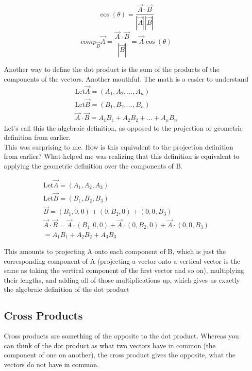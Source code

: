 \documentclass[12pt, letterpaper]{article}
\begin{document}
\begin{equation}
    \cos(\theta) = \frac{\vec{A} \cdot \vec{B}}{|\vec{A}||\vec{B}|}
\end{equation}
\begin{equation}
    comp_{\vec{B}} \vec{A} = \frac{\vec{A} \cdot \vec{B}}{|\vec{B}|} = \vec{A}\cos(\theta)
\end{equation}

\label{equOfDotProductDefinitions}
Another way to define the dot product is the sum of the products of the components of the vectors. Another mouthful. The math is a easier to understand
\begin{gather*}
    \text{Let} \vec{A} = (A_1, A_2, ..., A_n)\\
    \text{Let} \vec{B} = (B_1, B_2, ..., B_n)\\
    \vec{A} \cdot \vec{B} = A_1 B_1 + A_2 B_2 + ... + A_n B_n
\end{gather*}
Let's call this the algebraic definition, as opposed to the projection or geometric definition from earlier.\\
This was surprising to me. How is this equivalent to the projection definition from earlier?
What helped me was realizing that this definition is equivalent to applying the geometric definition over the components of B.

\begin{gather*}
    \text{Let} \vec{A} = (A_1, A_2, A_3)\\
    \text{Let} \vec{B} = (B_1, B_2, B_3)\\
    \vec{B} = (B_1, 0, 0) + (0, B_2, 0) + (0, 0, B_3)\\
    \vec{A} \cdot \vec{B} =  \vec{A} \cdot (B_1, 0, 0) + \vec{A} \cdot (0, B_2, 0) + \vec{A} \cdot (0, 0, B_3)\\
    = A_1 B_1 + A_2 B_2 + A_3 B_3
\end{gather*}

This amounts to projecting A onto each component of B, which is just the corresponding component of A (projecting a vector onto a vertical vector is the same as taking the vertical component of the first vector and so on), 
multiplying their lengths, and adding all of those multiplications up, which gives us exactly the algebraic definition of the dot product


\subsection{Cross Products}
Cross products are something of the opposite to the dot product. 
Whereas you can think of the dot product as what two vectors have in common (the component of one on another), 
the cross product gives the opposite, what the vectors do not have in common.
\end{document}
